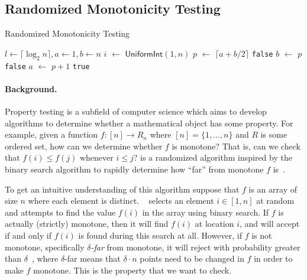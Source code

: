 \documentclass[acmsmall,review,anonymous]{acmart}\settopmatter{printfolios=true,printccs=false,printacmref=false}
\DeclarePairedDelimiter{\abs}{\lvert}{\rvert}
\newcommand*\Let[2]{\State #1 $\gets$ #2}
\begin{document}

\subsection{Randomized Monotonicity Testing}
\label{sec:monotone_testing}

\begin{algorithm}
  \caption{Randomized Monotonicity Testing~\citep{goldreich_2017}}
  \label{alg:monotone_testing}
  \begin{algorithmic}[1]
    \State $l \gets \lceil \log_2 n \rceil, a \gets 1, b \gets n$ \label{line:monotone_l}
    \Let{$i$}{$\mathsf{UniformInt}(1,n)$}
    \Let{$p$}{$\lceil a+b/2 \rceil$}
    \State\Return \texttt{false}
    \EndIf
    \Let{$b$}{$p$}
    \Else
    \State\Return \texttt{false}
    \EndIf
    \Let{$a$}{$p+1$}
    \EndIf
    \EndFor
    \State\Return \texttt{true}
    \EndFunction
  \end{algorithmic}
\end{algorithm}

\paragraph*{Background.}
Property testing is a subfield of computer science which aims to develop algorithms to determine whether a mathematical object has some property.
% 
For example, given a function $f: [n] \rightarrow R_n$ where $[n] = \{1,\ldots,n\}$ and $R$ is some ordered set, how can we determine whether $f$ is monotone?
% 
That is, can we check that $f(i) \leq f(j)$ whenever $i \leq j$?
% 
 is a randomized algorithm inspired by the binary
search algorithm to rapidly determine how ``far'' from monotone $f$ is~\citep{goldreich_2017}.

To get an intuitive understanding of this algorithm suppose that $f$ is an array of size $n$ where each element is distinct.
% 
~ selects an element $i \in [1,n]$ at random and attempts to find the value $f(i)$ in the array using binary search.
% 
If $f$ is actually (strictly) monotone, then it will find $f(i)$ at location $i$, and will accept if and only if $f(i)$ is found during this search at all.
% 
However, if $f$ is not monotone, specifically \textit{$\delta$-far} from
monotone, it will reject with probability greater than $\delta$~\citep{goldreich_2017}, where $\delta$-far means that $\delta\cdot n$ points need to be changed in $f$ in order to make $f$ monotone.
% 
This is the property that we want to check.
\end{document}
